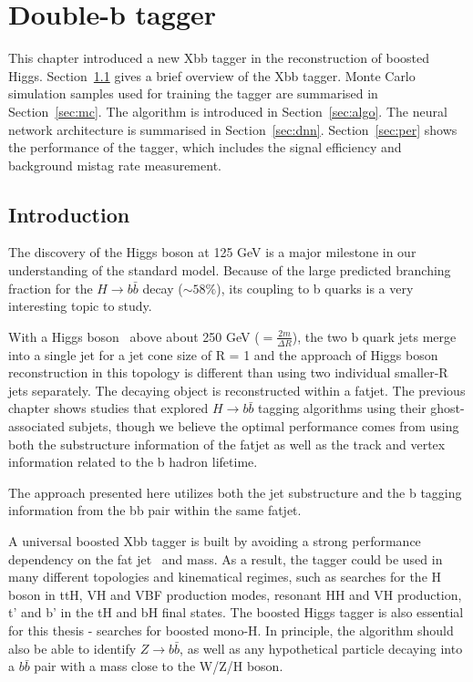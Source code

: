 \chapter{Double-b tagger}

\label{ch:xbb}
\par This chapter introduced a new Xbb tagger in the reconstruction of boosted Higgs. Section~\ref{sec:intro} gives a brief overview of the Xbb tagger. 
Monte Carlo simulation samples used for training the tagger are summarised in Section~\ref{sec:mc}.
The algorithm is introduced in Section~\ref{sec:algo}. The neural network architecture is summarised in Section~\ref{sec:dnn}. 
Section~\ref{sec:per} shows the performance of the tagger, which includes the signal efficiency and background mistag rate measurement. 


\section{Introduction}
\label{sec:intro}
\par The discovery of the Higgs boson at 125 GeV is a major milestone in our understanding of the standard model.
Because of the large predicted branching fraction for the $H\rightarrow b\bar{b}$ decay ($\sim 58\%$), 
its coupling to b quarks is a very interesting topic to study.
\par With a Higgs boson \pt~above about 250 GeV (\pt$ = \frac{2m}{\Delta R}$), the two b quark jets merge into a single jet for a jet cone size of R = 1 and the approach of Higgs boson reconstruction 
in this topology is different than using two individual smaller-R jets separately. The decaying object is reconstructed within a fatjet. 
The previous chapter shows studies that explored $H\rightarrow b\bar{b}$ tagging algorithms using their ghost-associated subjets, 
though we believe the optimal performance comes from using both the substructure information of the fatjet as well as the track and vertex information related to the b hadron lifetime. 
\par The approach presented here utilizes both the jet substructure and the b tagging information from the bb pair within the same fatjet.

\par A universal boosted Xbb tagger is built by avoiding a strong performance dependency on the fat jet \pt~and mass. As a result, 
the tagger could be used in many different topologies and kinematical regimes, such as searches for the H boson in ttH, VH and VBF production modes, 
resonant HH and VH production, t' and b' in the tH and bH final states. The boosted Higgs tagger is also essential for this thesis - searches for boosted mono-H. 
In principle, the algorithm should also be able to identify $Z\rightarrow b\bar{b}$, as well as any hypothetical particle decaying into a $b\bar{b}$ pair with a mass close to the W/Z/H boson.

